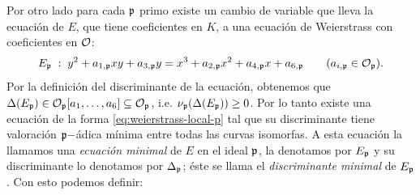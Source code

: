 Por otro lado para cada $\mathfrak{p}$ primo existe un cambio de variable que lleva la ecuación de $E$, que tiene coeficientes en $K$, a una ecuación de Weierstrass con coeficientes en $\mathcal{O}$:
\begin{equation}\label{eq:weierstrass-local-p}
	E_{\mathfrak{p}}\; :\; y^2+a_{1,\mathfrak{p}}xy+a_{3,\mathfrak{p}}y=x^3+a_{2,\mathfrak{p}}x^2+a_{4,\mathfrak{p}}x+a_{6,\mathfrak{p}}\qquad (a_{i,\mathfrak{p}}\in\mathcal{O}_{\mathfrak{p}}).
\end{equation}
Por la definición del discriminante de la ecuación, obtenemos que $\Delta(E_{\mathfrak{p}})\in\mathcal{O}_{\mathfrak{p}}[a_1,\ldots,a_6]\subseteq\mathcal{O}_{\mathfrak{p}}$, i.e. $\nu_{\mathfrak{p}}(\Delta(E_{\mathfrak{p}}))\geq0$. Por lo tanto existe una ecuación de la forma \eqref{eq:weierstrass-local-p} tal que su discriminante tiene valoración $\mathfrak{p}-$ádica mínima entre todas las curvas isomorfas. A esta ecuación la llamamos una \emph{ecuación minimal} de $E$ en el ideal $\mathfrak{p}$, la denotamos por $E_{\mathfrak{p}}$ y su discriminante lo denotamos por $\Delta_{\mathfrak{p}}$; éste se llama el \emph{discriminante minimal} de $E_{\mathfrak{p}}$. Con esto podemos definir:

